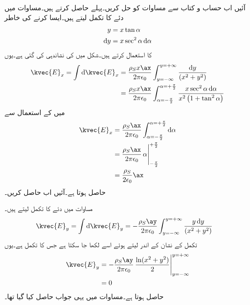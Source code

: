 آئیں اب حساب و کتاب سے مساوات  کو حل کریں۔پہلے  حاصل کرتے ہیں۔مساوات  میں دئے  کا تکمل لیتے ہیں۔ایسا کرنے کی خاطر
\begin{gather}
\begin{aligned}\label{مساوات_کولمب_ٹینجنٹ_کی_مدد_سے_تکملہ_کا_حصول}
y&=x \tan \alpha\\
\dif y &=x \sec^2 \alpha \dif \alpha
\end{aligned}
\end{gather}
کا استعمال کرتے ہیں۔شکل  میں  کی نشاندہی کی گئی ہے۔یوں
\begin{align*}
\kvec{E}_x=\int \dif \kvec{E}_x &=\frac{\rho_S x \ax}{2\pi \epsilon_0}\int_{y=-\infty}^{y=+\infty}\frac{\dif y }{ \left(x^2+y^2\right)}\\
&=\frac{\rho_S x \ax}{2\pi \epsilon_0}\int_{\alpha=-\frac{\pi}{2}}^{\alpha=+\frac{\pi}{2}} \frac{x \sec^2 \alpha \dif \alpha}{x^2\left(1+ \tan^2 \alpha\right)}
\end{align*}
میں  کے استعمال سے
\begin{gather}
\begin{aligned}\label{مساوات_کولمب_لامحدود_سطح_عمودی_جزو}
\kvec{E}_x&=\frac{\rho_S\ax}{2\pi \epsilon_0}\int_{\alpha=-\frac{\pi}{2}}^{\alpha=+\frac{\pi}{2}}\dif \alpha\\
&=\frac{\rho_S\ax}{2\pi \epsilon_0} \eval{\alpha}_{-\frac{\pi}{2}}^{+\frac{\pi}{2}}\\
&=\frac{\rho_S}{2 \epsilon_0}\ax
\end{aligned}
\end{gather}
حاصل ہوتا ہے۔آئیں اب  حاصل کریں۔

مساوات  میں دئے  کا تکمل لیتے ہیں۔
\begin{align*}
\kvec{E}_y=\int \dif \kvec{E}_y&=-\frac{\rho_S \ay}{2 \pi \epsilon_0} \int_{y=-\infty}^{y=+\infty}\frac{ y\dif y }{ \left(x^2+y^2\right)}
\end{align*}
تکمل کے نشان کے اندر  لیتے ہوئے  اسے  لکھا جا سکتا ہے جس کا تکمل  ہے۔یوں
\begin{gather}
\begin{aligned}\label{مساوات_کولمب_لامحدود_سطح_افقی_جزو}
\kvec{E}_y&=-\frac{\rho_S \ay}{2 \pi \epsilon_0} \eval{\frac{\ln(x^2+y^2)}{2}}_{y=-\infty}^{y=+\infty}\\
&=0
\end{aligned}
\end{gather}
حاصل ہوتا ہے۔مساوات  میں یہی جواب حاصل کیا گیا تھا۔

